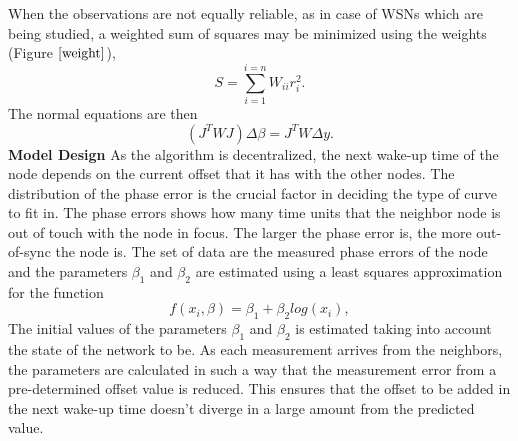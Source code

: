 \documentclass[journal]{IEEEtran}
\begin{document}
When the observations are not equally reliable, as in case of WSNs
which are being studied, a weighted sum of squares may be minimized
using the weights (Figure $\ref{weight}$),
\begin{equation}
    S=\sum_{i=1}^{i=n}W_{ii}r_i^2.
\end{equation}
The normal equations are then
\begin{equation}
    \left(J^TWJ\right)\Delta  \beta=J^TW\Delta y.
\end{equation}
\textbf{Model Design}\newline
As the algorithm is decentralized, the next wake-up time of the node depends on the current offset that it has with the other nodes. The distribution of the phase error is the crucial factor in deciding the type of curve to fit in. The phase errors shows how many time units that the neighbor node is out of touch with the node in focus. The larger the phase error is, the more out-of-sync the node is.\newline
The set of data are the measured phase errors of the node and the parameters $\beta_1$ and $\beta_2$ are estimated using a least squares approximation for the function
\begin{equation}
 f(x_i,\beta)= \beta _1 + \beta_2log(x_i),
\end{equation}
The initial values of the parameters $\beta_1$ and $\beta_2$ is estimated taking into account
the state of the network to be. \newline
As each measurement arrives from the neighbors, the parameters are calculated in such a way that the measurement error from a pre-determined offset value is reduced. This ensures that the offset to be added in the next wake-up time doesn't diverge in a large amount from the predicted value.
\end{document}
